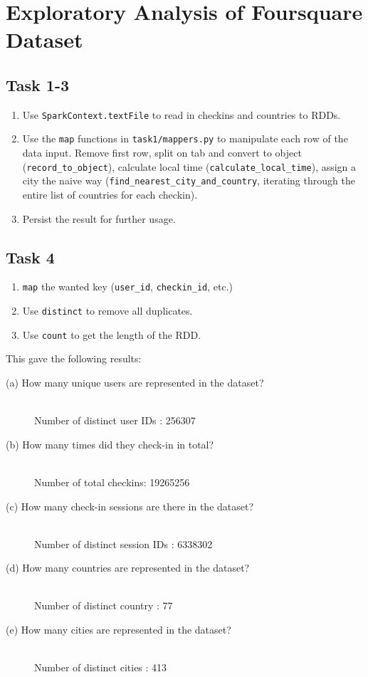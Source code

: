 \chapter{Exploratory Analysis of Foursquare Dataset}

\section{Task 1-3}

\begin{enumerate}
    \item Use \verb|SparkContext.textFile| to read in checkins and countries to RDDs.
    \item Use the \verb|map| functions in \verb|task1/mappers.py| to manipulate each row of the data input. Remove first row, split on tab and convert to object (\verb|record_to_object|), calculate local time (\verb|calculate_local_time|), assign a city the naive way (\verb|find_nearest_city_and_country|, iterating through the entire list of countries for each checkin).
    \item Persist the result for further usage. 
    
\end{enumerate}

\section{Task 4}
\begin{enumerate}
    \item \verb|map| the wanted key (\verb|user_id|, \verb|checkin_id|, etc.)
    \item Use \verb|distinct| to remove all duplicates.
    \item Use \verb|count| to get the length of the RDD. 
\end{enumerate}

This gave the following results:
\begin{description}
    \item[(a) How many unique users are represented in the dataset?] \hfill \\
        Number of distinct user IDs : 256307
    \item[(b) How many times did they check-in in total?] \hfill  \\
        Number of total checkins: 19265256
    \item[(c) How many check-in sessions are there in the dataset?] \hfill  \\
        Number of distinct session IDs : 6338302
    \item[(d) How many countries are represented in the dataset?]\hfill  \\
        Number of distinct country : 77
    \item[(e) How many cities are represented in the dataset?]\hfill  \\
        Number of distinct cities : 413
\end{description}



